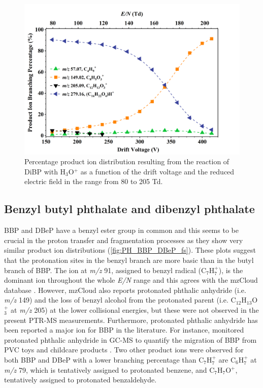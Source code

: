 \begin{figure}[htb]%
\centering
\includegraphics[height=0.4\textheight]{pics/DiBP-BR.png}
\caption{Percentage product ion distribution resulting from the reaction of DiBP with H$_3$O$^+$ as a function of the drift voltage and the reduced electric field in the range from 80 to 205 Td.}
\label{fig:PH_DiBP_fs}
\end{figure}





\subsection{Benzyl butyl phthalate
and dibenzyl phthalate}

BBP and DBeP have a benzyl ester group in common and this seems to be crucial in the proton transfer and fragmentation processes as they show very similar product ion distributions (\autoref{fig:PH_BBP_DBeP_fs}). 
These plots suggest that the protonation sites in the benzyl branch are more basic than in the butyl branch  of BBP.
%
The ion at \textit{m/z} 91, assigned to benzyl radical (C$_7$H$_7^+$), is the dominant ion throughout the whole \textit{E/N} range and this agrees with the mzCloud database \cite{mzcloudBBP}.
%
However, mzCloud also reports protonated phthalic anhydride (i.e. \textit{m/z} 149) and the loss of benzyl alcohol from the protonated parent (i.e. C$_{12}$H$_{13}$O$_3^+$ at \textit{m/z} 205) at the lower collisional energies, but these were not observed in the present PTR-MS measurements. 
%
Furthermore, protonated phthalic anhydride has been reported a major ion for BBP in the literature. For instance, \citeauthor{earls2003gas} monitored protonated phthalic anhydride  in GC-MS to quantify the migration of BBP from PVC toys and childcare products \cite{earls2003gas}.
%
Two other product ions were observed for both BBP and DBeP with a lower branching percentage than C$_7$H$_7^+$ are
C$_6$H$_7^+$ at \textit{m/z} 79, which is tentatively assigned to protonated benzene, 
and C$_7$H$_7$O$^+$, tentatively assigned to protonated benzaldehyde.

